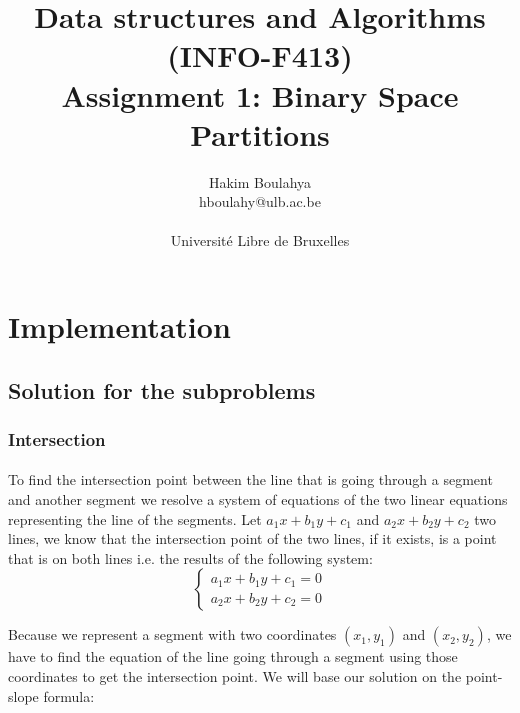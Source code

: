 \documentclass[letterpaper]{article}
\title{Data structures and Algorithms (INFO-F413) \\
\Large  Assignment 1: Binary Space Partitions}
\author{\Large Hakim Boulahya \\
hboulahy@ulb.ac.be\\
\\
Université Libre de Bruxelles
}
\begin{document}


\maketitle
\tableofcontents
\newpage

\section{Implementation}


\subsection{Solution for the subproblems}

\subsubsection{Intersection}

\paragraph{}

To find the intersection point between the line that is going through a segment
and another segment we resolve a system of equations of the two linear equations
representing the line of the segments. Let $a_1x + b_1y + c_1$ and
$a_2x + b_2y + c_2$ two lines, we know that the intersection point of the two lines,
if it exists, is a point that is on both lines i.e. the results of the following system:
\begin{equation}
  \label{eq:lin_sys}
\begin{cases}
a_1x + b_1y + c_1 = 0 \\
a_2x + b_2y + c_2 = 0
\end{cases}
\end{equation}

Because we represent a segment with two coordinates $(x_1, y_1)$ and $(x_2, y_2)$,
we have to find the equation of the line going through a segment using those
coordinates to get the intersection point.
We will base our solution on the point-slope formula:
\end{document}
